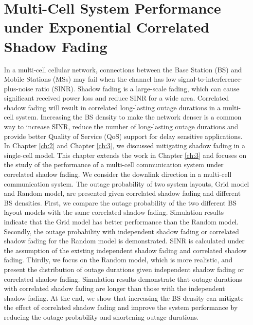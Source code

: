 \chapter{Multi-Cell System Performance under Exponential Correlated Shadow Fading}\label{ch:4}
 \par In a multi-cell cellular network, connections between the Base Station (BS) and Mobile Stations (MSs) may fail when the channel has low signal-to-interference-plus-noise ratio (SINR). Shadow fading is a large-scale fading, which can cause significant received power loss and reduce SINR for a wide area. Correlated shadow fading will result in correlated long-lasting outage durations in a multi-cell system. Increasing the BS density to make the network denser is a common way to increase SINR, reduce the number of long-lasting outage durations and provide better Quality of Service (QoS) support for delay sensitive applications. In Chapter \ref{ch:2} and Chapter \ref{ch:3}, we discussed mitigating shadow fading in a single-cell model. This chapter extends the work in Chapter \ref{ch:3} and focuses on the study of the performance of a multi-cell communication system under correlated shadow fading. We consider the downlink direction in a multi-cell communication system. The outage probability of two system layouts, Grid model and Random model, are presented given correlated shadow fading and different BS densities. First, we compare the outage probability of the two different BS layout models with the same correlated shadow fading. Simulation results indicate that the Grid model has better performance than the Random model. Secondly, the outage probability with independent shadow fading or correlated shadow fading for the Random model is demonstrated. SINR is calculated under the assumption of the existing independent shadow fading and correlated shadow fading. Thirdly, we focus on the Random model, which is more realistic, and present the distribution of outage durations given independent shadow fading or correlated shadow fading. Simulation results demonstrate that outage durations with correlated shadow fading are longer than those with the independent shadow fading. At the end, we show that increasing the BS density can mitigate the effect of correlated shadow fading and improve the system performance by reducing the outage probability and shortening outage durations. 
